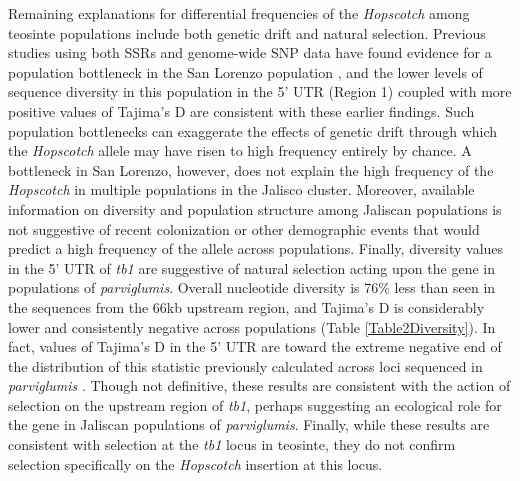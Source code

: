 \documentclass[11pt]{article} %
\begin{document}
\begin{linenumbers}
\begin{flushleft}
Remaining explanations for differential frequencies of the \emph{Hopscotch} among teosinte populations include both genetic drift and natural selection.  Previous studies using both SSRs and genome-wide SNP data have found evidence for a population bottleneck in the San Lorenzo population \citep{Hufford2010, Pyhajarvi2013}, and the lower levels of sequence diversity in this population in the 5' UTR (Region 1) coupled with more positive values of Tajima's D are consistent with these earlier findings. Such population bottlenecks can exaggerate the effects of genetic drift through which the \emph{Hopscotch} allele may have risen to high frequency entirely by chance. A bottleneck in San Lorenzo, however, does not explain the high frequency of the \emph{Hopscotch} in multiple populations in the Jalisco cluster. Moreover, available information on diversity and population structure among Jaliscan populations \citep{Hufford2010, Pyhajarvi2013} is not suggestive of recent colonization or other demographic events that would predict a high frequency of the allele across populations. 
Finally, diversity values in the 5' UTR of \emph{tb1} are suggestive of natural selection acting upon the gene in populations of \emph{parviglumis}. Overall nucleotide diversity is 76\% less than seen in the sequences from the 66kb upstream region, and Tajima's D is considerably lower and consistently negative across populations (Table \ref{Table2Diversity}). In fact, values of Tajima's D in the 5' UTR are toward the extreme negative end of the distribution of this statistic previously calculated across loci sequenced in \emph{parviglumis} \citep{Wright27052005, Moeller01072007}. Though not definitive, these results are consistent with the action of selection on the upstream region of \emph{tb1}, perhaps suggesting an ecological role for the gene in Jaliscan populations of \emph{parviglumis}.  Finally, while these results are consistent with selection at the \emph{tb1} locus in teosinte, they do not confirm selection specifically on the \emph{Hopscotch} insertion at this locus.


\end{flushleft}
\end{linenumbers}
\end{document}
